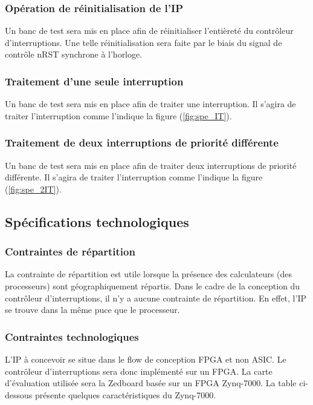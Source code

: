 \subsubsection*{Opération de réinitialisation de l'IP}

Un banc de test sera mis en place afin de réinitialiser l'entièreté du contrôleur d'interruptions.
Une telle réinitialisation sera faite par le biais du signal de contrôle nRST synchrone à l'horloge.

\subsubsection*{Traitement d'une seule interruption}

Un banc de test sera mis en place afin de traiter une interruption.
Il s'agira de traiter l'interruption comme l'indique la figure (\ref{fig:spe_IT}).

\subsubsection*{Traitement de deux interruptions de priorité différente}

Un banc de test sera mis en place afin de traiter deux interruptions de priorité différente.
Il s'agira de traiter l'interruption comme l'indique la figure (\ref{fig:spe_2IT}).

\subsection{Spécifications technologiques}

\subsubsection{Contraintes de répartition}

La contrainte de répartition est utile lorsque la présence des calculateurs (des processeurs) sont géographiquement répartis.
Dans le cadre de la conception du contrôleur d'interruptions, il n'y a aucune contrainte de répartition.
En effet, l'IP se trouve dans la même puce que le processeur.

\subsubsection{Contraintes technologiques}

L'IP à concevoir se situe dans le flow de conception FPGA et non ASIC.
Le contrôleur d'interruptions sera donc implémenté sur un FPGA.
La carte d'évaluation utilisée sera la Zedboard basée sur un FPGA Zynq-7000. La table ci-dessous présente quelques caractéristiques du Zynq-7000.

